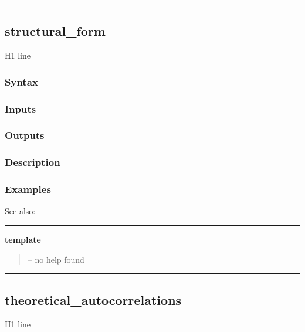 \documentclass[letterpaper,10pt,english]{sphinxmanual}
\begin{document}
\bigskip\hrule{}\bigskip



\subsection{structural\_form}
\label{classes/models/@rfvar/rfvar:id145}\label{classes/models/@rfvar/rfvar:structural-form}
H1 line


\subsubsection{Syntax}
\label{classes/models/@rfvar/rfvar:id146}

\subsubsection{Inputs}
\label{classes/models/@rfvar/rfvar:id147}

\subsubsection{Outputs}
\label{classes/models/@rfvar/rfvar:id148}

\subsubsection{Description}
\label{classes/models/@rfvar/rfvar:id149}

\subsubsection{Examples}
\label{classes/models/@rfvar/rfvar:id150}
See also:


\bigskip\hrule{}\bigskip

\label{classes/models/@rfvar/rfvar:template}
\textbf{template}
\begin{quote}

-- no help found
\end{quote}


\bigskip\hrule{}\bigskip



\subsection{theoretical\_autocorrelations}
\label{classes/models/@rfvar/rfvar:theoretical-autocorrelations}\label{classes/models/@rfvar/rfvar:id151}
H1 line
\end{document}

